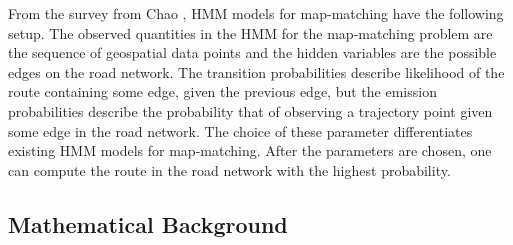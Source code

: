 \documentclass{article}
\numberwithin{equation}{section}
\theoremstyle{definition}
\begin{document}
From the survey from Chao \cite{CXHZ}, HMM models for map-matching have the following setup. The observed quantities in the HMM for the map-matching problem are the sequence of geospatial data points and the hidden variables are the possible edges on the road network. The transition probabilities describe likelihood of the route containing some edge, given the previous edge, but the emission probabilities describe the probability that of observing a trajectory point given some edge in the road network. The choice of these parameter differentiates existing HMM models for map-matching. After the parameters are chosen, one can compute the route in the road network with the highest probability.  









\subsection{Mathematical Background} \label{IntroOfOT}


\end{document}
